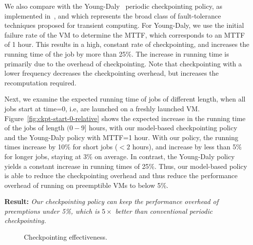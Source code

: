 \documentclass[sigconf]{acmart} %
\newcommand{\myfigspace}[0]{-0.45cm}
\begin{document}
We also compare with the Young-Daly~\cite{daly2006higher} periodic checkpointing policy, as implemented in~\cite{flint, proteus-eur17, marathe2014exploiting}, and which represents the broad class of fault-tolerance techniques proposed for transient computing. 
For Young-Daly, we use the initial failure rate of the VM to determine the MTTF, which corresponds to an MTTF of 1 hour. 
This results in a high, constant rate of checkpointing, and increases the running time of the job by more than 25\%.
The increase in running time is primarily due to the overhead of checkpointing. 
Note that checkpointing with a lower frequency decreases the checkpointing overhead, but increases the recomputation required.

Next, we examine the expected running time of jobs of different length, when all jobs start at time=0, i.e, are launched on a freshly launched VM.
Figure~\ref{fig:ckpt-start-0-relative} shows the expected increase in the running time of the jobs of length $(0-9] $ hours, with our model-based checkpointing policy and the Young-Daly policy with MTTF=1 hour.
With our policy, the running times increase by 10\% for short jobs ($<2$  hours), and increase by less than 5\% for longer jobs, staying at 3\% on average. 
In contrast, the Young-Daly policy yields a constant increase in running times of 25\%. 
Thus, our model-based policy is able to reduce the checkpointing overhead and thus reduce the performance overhead of running on preemptible VMs to below 5\%. 

\noindent \textbf{Result:} \emph{Our checkpointing policy can keep the performance overhead of preemptions under 5\%, which is $5\times$ better than conventional periodic checkpointing.}

\begin{figure}[t]
  \vspace*{\myfigspace}
\vspace*{\myfigspace}
  \caption{Checkpointing effectiveness.}
  \label{fig:ckpt-all}
  \vspace*{-0.3cm}
\end{figure}
\end{document}
